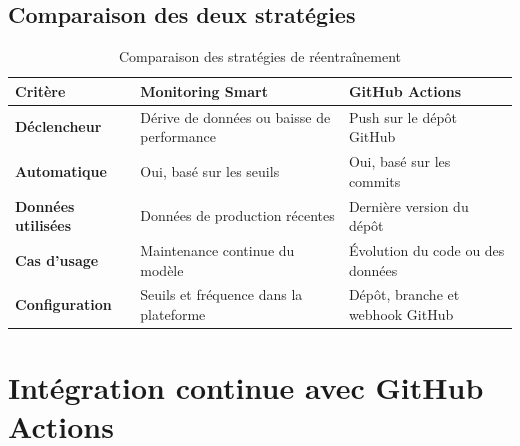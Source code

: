\subsection{Comparaison des deux stratégies}
\label{subsec:sprint3-retraining-comparison}

\begin{table}[H]

\centering
\small

\renewcommand{\arraystretch}{1.15}
\setlength{\tabcolsep}{4pt}

\begin{tabular}{|p{3.5cm}|p{4.8cm}|p{4.8cm}|}

\hline

\rowcolor{cyan!20}
\textbf{Critère}
&
\textbf{Monitoring Smart}
&
\textbf{GitHub Actions}
\\
\hline

\textbf{Déclencheur}
&
Dérive de données ou baisse de performance
&
Push sur le dépôt GitHub
\\
\hline

\rowcolor{cyan!7}
\textbf{Automatique}
&
Oui, basé sur les seuils
&
Oui, basé sur les commits
\\
\hline

\textbf{Données utilisées}
&
Données de production récentes
&
Dernière version du dépôt
\\
\hline

\rowcolor{cyan!7}
\textbf{Cas d'usage}
&
Maintenance continue du modèle
&
Évolution du code ou des données
\\
\hline

\textbf{Configuration}
&
Seuils et fréquence dans la plateforme
&
Dépôt, branche et webhook GitHub
\\
\hline

\end{tabular}

\caption{Comparaison des stratégies de réentraînement}
\label{tab:sprint3-retraining-comparison}

\end{table}



\section{Intégration continue avec GitHub Actions}
\label{sec:sprint3-cicd}

